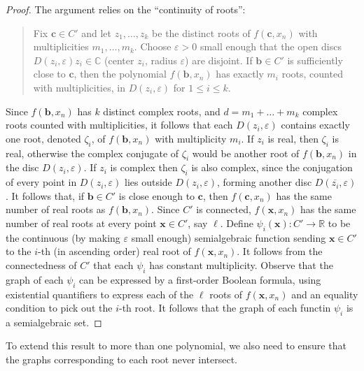 \documentclass[
]{book}
\theoremstyle{definition}
\theoremstyle{definition}
\theoremstyle{definition}
\theoremstyle{definition}
\theoremstyle{remark}
\begin{document}
\begin{proof}
The argument relies on the ``continuity of roots'':

\begin{quote}
Fix \(\mathbf{c} \in C'\) and let \(z_1,\ldots,z_k\) be the distinct roots of \(f(\mathbf{c},x_n)\) with multiplicities \(m_1,\ldots,m_k\).
Choose \(\varepsilon > 0\) small enough that the open discs \(D(z_i,\varepsilon) z_i \in \mathbb{C}\) (center \(z_i\), radius \(\varepsilon\)) are disjoint. If \(\mathbf{b} \in C'\) is sufficiently close to \(\mathbf{c}\), then the polynomial \(f(\mathbf{b}, x_n)\) has exactly \(m_i\) roots, counted with multiplicities, in \(D(z_i,\varepsilon)\) for \(1\le i \le k\).
\end{quote}

Since \(f(\mathbf{b},x_n)\) has \(k\) distinct complex roots, and \(d = m_1+ \ldots + m_k\) complex roots counted with multiplicities, it follows that each \(D(z_i,\varepsilon)\) contains exactly one root, denoted \(\zeta_i\), of \(f(\mathbf{b},x_n)\) with multiplicity \(m_i\).
If \(z_i\) is real, then \(\zeta_i\) is real, otherwise the complex conjugate of \(\zeta_i\) would be another root of \(f(\mathbf{b},x_n)\) in the disc \(D(z_i,\varepsilon)\).
If \(z_i\) is complex then \(\zeta_i\) is also complex, since the conjugation of every point in \(D(z_i, \varepsilon)\) lies outside \(D(z_i, \varepsilon)\), forming another disc \(D(\overline{z_i}, \varepsilon)\).
It follows that, if \(\mathbf{b} \in C'\) is close enough to \(\mathbf{c}\), then \(f(\mathbf{c},x_n)\) has the same number of real roots as \(f(\mathbf{b},x_n)\). Since \(C'\) is connected, \(f(\mathbf{x},x_n)\) has the same number of real roots at every point \(\mathbf{x} \in C'\), say \(\ell\).
Define \(\psi_i(\mathbf{x}) : C' \to \mathbb{R}\) to be the continuous (by making \(\varepsilon\) small enough) semialgebraic function sending \(\mathbf{x} \in C'\) to the \(i\)-th (in ascending order) real root of \(f(\mathbf{x},x_n)\). It follows from the connectedness of \(C'\) that each \(\psi_i\) has constant multiplicity.
Observe that the graph of each \(\psi_i\) can be expressed by a first-order Boolean formula, using existential quantifiers to express each of the \(\ell\) roots of \(f(\mathbf{x},x_n)\) and an equality condition to pick out the \(i\)-th root.
It follows that the graph of each functin \(\psi_i\) is a semialgebraic set.
\end{proof}

To extend this result to more than one polynomial, we also need to ensure that the graphs corresponding to each root never intersect.
\end{document}
